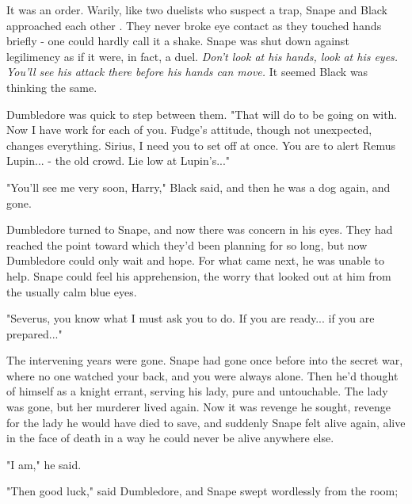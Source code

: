 It was an order. Warily, like two duelists who suspect a trap, Snape and Black approached each other . They never broke eye contact as they touched hands briefly - one could hardly call it a shake. Snape was shut down against legilimency as if it were, in fact, a duel. \emph{Don't look at his hands, look at his eyes. You'll see his attack there before his hands can move.} It seemed Black was thinking the same.

Dumbledore was quick to step between them. "That will do to be going on with. Now I have work for each of you. Fudge's attitude, though not unexpected, changes everything. Sirius, I need you to set off at once. You are to alert Remus Lupin... - the old crowd. Lie low at Lupin's..."

"You'll see me very soon, Harry," Black said, and then he was a dog again, and gone.

Dumbledore turned to Snape, and now there was concern in his eyes. They had reached the point toward which they'd been planning for so long, but now Dumbledore could only wait and hope. For what came next, he was unable to help. Snape could feel his apprehension, the worry that looked out at him from the usually calm blue eyes.

"Severus, you know what I must ask you to do. If you are ready... if you are prepared..."

The intervening years were gone. Snape had gone once before into the secret war, where no one watched your back, and you were always alone. Then he'd thought of himself as a knight errant, serving his lady, pure and untouchable. The lady was gone, but her murderer lived again. Now it was revenge he sought, revenge for the lady he would have died to save, and suddenly Snape felt alive again, alive in the face of death in a way he could never be alive anywhere else.

"I am," he said.

"Then good luck," said Dumbledore, and Snape swept wordlessly from the room;


